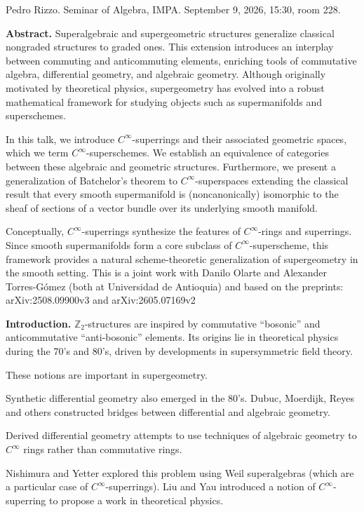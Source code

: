 \noindent
Pedro Rizzo.
Seminar of Algebra, IMPA.
September 9, 2026, 15:30, room 228.

\medskip\noindent
{\bf Abstract.}
Superalgebraic and supergeometric structures
generalize classical nongraded structures to
graded ones. This extension introduces an
interplay between commuting and anticommuting
elements, enriching tools of commutative
algebra, differential geometry, and algebraic
geometry. Although originally motivated by
theoretical physics, supergeometry has
evolved into a robust mathematical framework
for studying objects such as supermanifolds
and superschemes.

In this talk, we introduce
$C^\infty$-superrings and their associated
geometric spaces, which we term
$C^\infty$-superschemes. We establish an
equivalence of categories between these
algebraic and geometric structures.
Furthermore, we present a generalization of
Batchelor’s theorem to $C^\infty$-superspaces
extending the classical result that every
smooth supermanifold is (noncanonically)
isomorphic to the sheaf of sections of a
vector bundle over its underlying smooth
manifold.

Conceptually, $C^\infty$-superrings
synthesize the features of $C^\infty$-rings
and superrings. Since smooth supermanifolds
form a core subclass of
$C^\infty$-superscheme, this framework
provides a natural scheme-theoretic
generalization of supergeometry in the smooth
setting. This is a joint work with Danilo
Olarte and Alexander Torres-Gómez (both at
Universidad de Antioquia) and based on the
preprints: arXiv:2508.09900v3 and
arXiv:2605.07169v2



\medskip\noindent
{\bf Introduction.}
$\mathbb{Z}_2$-structures
are inspired by commutative ``bosonic''
and anticommutative ``anti-bosonic''
elements. Its origins lie in theoretical
physics during the 70's and 80's, driven by
developments in supersymmetric field theory.

These notions are important in
supergeometry.
 
Synthetic differential geometry
also emerged in the 80's. Dubuc, Moerdijk,
Reyes and others constructed bridges between
differential and algebraic geometry.

Derived differential geometry attempts to
use techniques of algebraic geometry to
$C^\infty$ rings rather than commutative
rings.

Nishimura and Yetter explored this problem
using Weil superalgebras (which are a
particular case of $C^\infty$-superrings).
Liu and Yau introduced a notion of
$C^\infty$-superring to propose a work in
theoretical physics.

